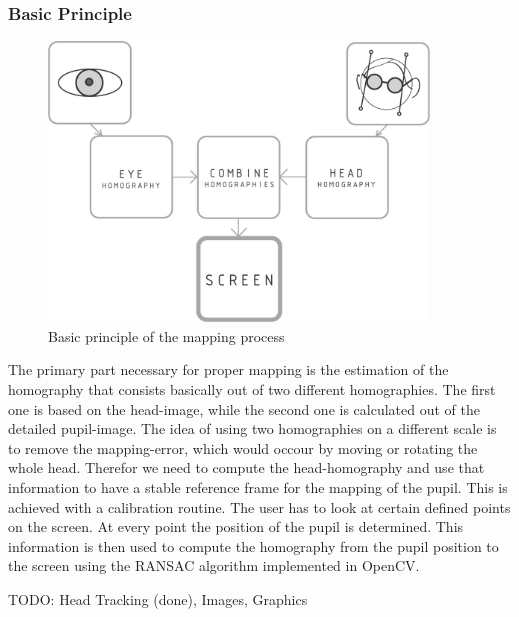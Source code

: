 \subsubsection{Basic Principle}
\begin{figure}[H]
  \centering
  \includegraphics[width=0.9\textwidth]{../finalpres/01c.pdf}
  \caption{Basic principle of the mapping process}\label{fig:basic}
\end{figure}
The primary part necessary for proper mapping is the estimation of the homography that consists basically out of two different homographies. The first one is based on the head-image, while the second one is calculated out of the detailed pupil-image. 
The idea of using two homographies on a different scale is to remove the mapping-error, which would occour by moving or rotating the whole head. Therefor we need to compute the head-homography and use that information to have a stable reference frame for the mapping of the pupil. 
This is achieved with a calibration routine. The user has to look at certain defined points on the screen. 
At every point the position of the pupil is determined. 
This information is then used to compute the homography from the pupil position to the screen using the RANSAC algorithm implemented in OpenCV. 

TODO: Head Tracking (done), Images, Graphics

